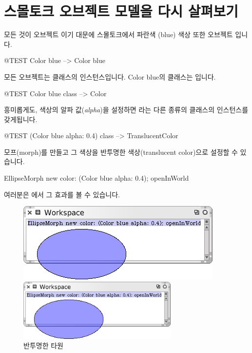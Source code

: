 \documentclass[a4paper,10pt,twoside]{book}
\begin{document}
\section{스몰토크 오브젝트 모델을 다시 살펴보기}

모든 것이 오브젝트 이기 대문에 스몰토크에서 파란색 (blue) 색상 또한 오브젝트 입니다.
\begin{code}{@TEST}
Color blue --> Color blue
\end{code}

\noindent
모든 오브젝트는 클래스의 인스턴스입니다. Color blue의 클래스는 입니다. 
\begin{code}{@TEST}
Color blue class --> Color
\end{code}

\noindent
흥미롭게도, 색상의 알파 값(\emph{alpha})을 설정하면 라는 다른 종류의 클래스의 인스턴스를 갖게됩니다. 
\begin{code}{@TEST}
(Color blue alpha: 0.4) class --> TranslucentColor
\end{code}

\noindent
모프(morph)를 만들고 그 색상을 반투명한 색상(translucent color)으로 설정할 수 있습니다.
\begin{code}{}
EllipseMorph new color: (Color blue alpha: 0.4); openInWorld
\end{code}
\noindent
여러분은 에서 그 효과를 볼 수 있습니다.

\begin{center}
\begin{figure}[!ht]
\ifluluelse
	{\centerline {\includegraphics[scale=0.7]{TranslucentEllipse}}}
	{\centerline {\includegraphics[width=8cm]{TranslucentEllipse}}}
\caption{반투명한 타원\label{fig:translucentEllipse}}
\end{figure}
\end{center}
\end{document}
